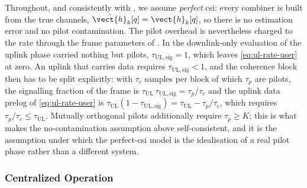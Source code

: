 Throughout, and consistently with , we assume \emph{perfect}
\gls{csi}: every combiner is built from the true channels,
$\hat{\vect{h}}_{k}[q]=\vect{h}_{k}[q]$, so there is no estimation error and no
pilot contamination. The pilot overhead is nevertheless charged to the rate
through the frame parameters of . In the downlink-only
evaluation of  the uplink phase carried nothing but pilots,
$\tau_{\mathrm{UL,sig}}=1$, which leaves \eqref{eq:ul-rate-user} at zero. An
uplink that carries data requires $\tau_{\mathrm{UL,sig}}<1$, and the coherence
block then has to be split explicitly: with $\tau_{c}$ samples per block of which
$\tau_{p}$ are pilots, the signalling fraction of the frame is
$\tau_{\mathrm{UL}}\,\tau_{\mathrm{UL,sig}}=\tau_{p}/\tau_{c}$ and the uplink
data prelog of \eqref{eq:ul-rate-user} is
$\tau_{\mathrm{UL}}(1-\tau_{\mathrm{UL,sig}})=\tau_{\mathrm{UL}}-\tau_{p}/\tau_{c}$,
which requires $\tau_{p}/\tau_{c}\leq\tau_{\mathrm{UL}}$. Mutually orthogonal
pilots additionally require $\tau_{p}\geq K$; this is what makes the
no-contamination assumption above self-consistent, and it is the assumption under
which the perfect-\gls{csi} model is the idealisation of a real pilot phase rather
than a different system.


\subsubsection{Centralized Operation}
\label{sssec:ul_centralized}

